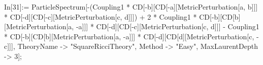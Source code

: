 In[31]:= ParticleSpectrum[-(Coupling1 * CD[-b][CD[-a][MetricPerturbation[a, b]]] * CD[-d][CD[-c][MetricPerturbation[c, d]]]) + 2 * Coupling1 * CD[-b][CD[b][MetricPerturbation[a, -a]]] * CD[-d][CD[-c][MetricPerturbation[c, d]]] - Coupling1 * CD[-b][CD[b][MetricPerturbation[a, -a]]] * CD[-d][CD[d][MetricPerturbation[c, -c]]], TheoryName -> "SquareRicciTheory", Method -> "Easy", MaxLaurentDepth -> 3]; 